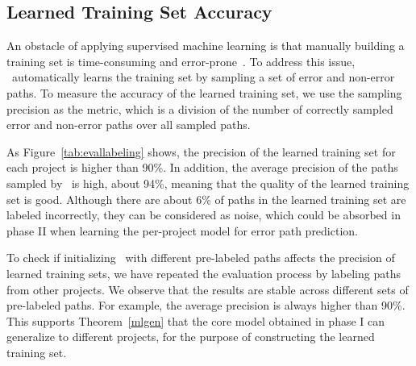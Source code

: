 \documentclass[12pt]{report}	%
\begin{document}
\subsection{Learned Training Set Accuracy}
\label{sec:app:eval:phase1}

An obstacle of applying supervised machine learning is that
manually building a training set is 
time-consuming and error-prone~\cite{Sheng:2008:GLI:1401890.1401965}. 
%
To address this issue,
\newTool\ automatically learns the training set by sampling a set of error and non-error paths.
%
To measure the accuracy of the learned training set,
we use the sampling precision as the metric,
which is a division of the number 
of correctly sampled error and non-error paths over all sampled paths. 


As Figure~\ref{tab:evallabeling} shows,
the precision of the learned training set for each project is higher than 90\%.
In addition, the average precision of the paths sampled by \newTool\ is high,
about 94\%, meaning that the quality of the learned training set is good.
%
Although there are about 6\% of paths in the learned training set are labeled incorrectly,
they can be considered as noise,
which could be absorbed in phase II
when learning the per-project model for error path prediction.
%

To check if initializing \newTool\ with different pre-labeled paths affects the precision of learned training sets,
we have repeated the evaluation process by labeling paths from other projects.
We observe that the results are stable across different sets of pre-labeled paths.
For example, the average precision is always higher than 90\%.
%
This supports Theorem~\ref{mlgen} that
the core model obtained in phase I can generalize to different projects,
for the purpose of constructing the learned training set.
%
\end{document}
